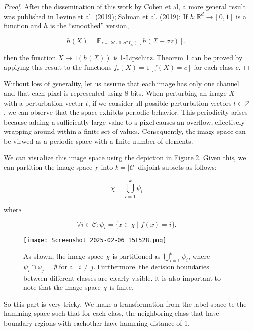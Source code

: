 \documentclass{article}
\theoremstyle{plain}
\theoremstyle{definition}
\theoremstyle{remark}
\begin{document}
\begin{proof}
After the dissemination of this work by \href{https://arxiv.org/abs/1902.02918}{Cohen et al}, a more general result was published in \href{https://examplelink.com}{Levine et al. (2019)}; \href{https://examplelink.com}{Salman et al. (2019)}: If \( h : \mathbb{R}^d \to [0,1] \) is a function and \( h \) is the “smoothed” version,

\[
h(X) = \mathbb{E}_{z \sim \mathcal{N}(0, \sigma^2I_D)}[h(X + \sigma z)],
\]

then the function \( X \mapsto 1(h(X)) \) is 1-Lipschitz. Theorem 1 can be proved by applying this result to the functions \( f_c(X) = 1[f(X) = c] \) for each class \( c \).

\end{proof}

Without loss of generality, let us assume that each image has only one channel and that each pixel is represented using 8 bits. When perturbing an image \( X \) with a perturbation vector \( t \), if we consider all possible perturbation vectors \( t \in \mathcal{V} \), we can observe that the space exhibits periodic behavior. This periodicity arises because adding a sufficiently large value to a pixel causes an overflow, effectively wrapping around within a finite set of values. Consequently, the image space can be viewed as a periodic space with a finite number of elements.

We can visualize this image space using the depiction in Figure 2. Given this, we can partition the image space \( \chi \) into \( k = |\mathcal{C}| \) disjoint subsets as follows:

\[
\chi = \bigcup_{i=1}^{k} \psi_i
\]

where 

\[
\forall i \in \mathcal{C}: 
\psi_i = \{ x \in \chi \mid f(x) = i \}.
\]

\begin{figure}[h]
    \centering
    \texttt{[image: Screenshot 2025-02-06 151528.png]}
    \caption{
    As shown, the image space \( \chi \) is partitioned as \( \bigcup_{i=1}^{k} \psi_i \), where \( \psi_i \cap \psi_j = \emptyset \) for all \( i \neq j \). Furthermore, the decision boundaries between different classes are clearly visible. It is also important to note that the image space \( \chi \) is finite.
    }
    \label{fig:cat}
\end{figure}

So this part is very tricky. We make a transformation from the label space to the hamming space such that for each class, the neighboring class that have boundary regions with eachother have hamming distance of 1.  \\
\end{document}
